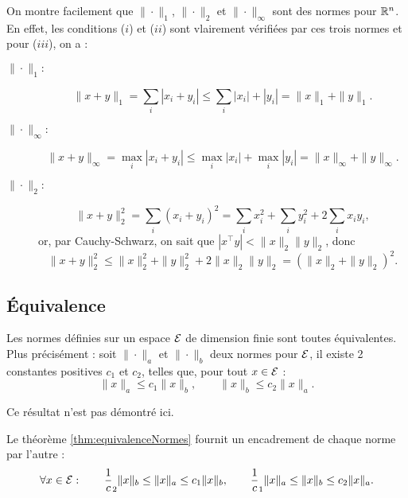 \remark
On montre facilement que $\|\cdot\|_1$, $\|\cdot\|_2$ et $\|\cdot\|_\infty$ sont des normes pour $\mathbb{R}^n$. En effet, les conditions ($i$) et ($ii$) sont vlairement vérifiées par ces trois normes et pour ($iii$), on a :
\begin{description}
  \item[$\|\cdot\|_1:$] 
  $$\|x+y\|_1 = \sum_i |x_i + y_i| \leq \sum_i |x_i| + |y_i| =  \|x\|_1 + \|y\|_1.$$
  \item[$\|\cdot\|_\infty:$] 
  $$\|x+y\|_\infty = \max_i |x_i + y_i| \leq \max_i |x_i| + \max_i |y_i| =  \|x\|_\infty + \|y\|_\infty.$$
  \item[$\|\cdot\|_2:$] 
  $$\|x+y\|^2_2 = \sum_i (x_i + y_i)^2 = \sum_i x_i^2 + \sum_i y_i^2 + 2 \sum_i x_i y_i,$$ 
  or, par Cauchy-Schwarz, on sait que $|x^\top y| < \|x\|_2 \|y\|_2$, donc 
  $$\|x+y\|^2_2 \leq \|x\|_2^2 + \|y\|_2^2 + 2 \|x\|_2 \|y\|_2 = (\|x\|_2 + \|y\|_2)^2.$$
\end{description}

\subsection{\'Equivalence} 

\begin{theorem} \label{thm:equivalenceNormes}
  Les normes définies sur un espace $\mathcal{E}$ de dimension finie sont toutes équivalentes. Plus précisément : soit $\|\cdot\|_a$ et $\|\cdot\|_b$ deux normes pour $\mathcal{E}$, il existe 2 constantes positives $c_1$ et $c_2$, telles que, pour tout $x \in \mathcal{E}$ :
  $$
  \|x\|_a \leq c_1 \|x\|_b, \qquad
  \|x\|_b \leq c_2 \|x\|_a.
  $$
\end{theorem}

Ce résultat n'est pas démontré ici. 

\remark
Le théorème \ref{thm:equivalenceNormes} fournit un encadrement de chaque norme par l'autre : 
$$
\forall x \in \mathcal{E}: \qquad
\frac1c_2 \|x\|_b \leq \|x\|_a \leq c_1 \|x\|_b, \qquad
\frac1c_1 \|x\|_a \leq \|x\|_b \leq c_2 \|x\|_a.
$$


